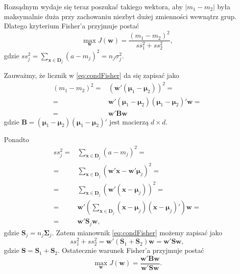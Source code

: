 \documentclass[
]{book}
\theoremstyle{plain}
\theoremstyle{definition}
\theoremstyle{definition}
\theoremstyle{definition}
\theoremstyle{definition}
\theoremstyle{definition}
\theoremstyle{remark}
\begin{document}
Rozsądnym wydaje się teraz poszukać takiego wektora, aby \(|m_1-m_2|\) była maksymalnie duża przy zachowaniu niezbyt dużej zmienności wewnątrz grup. Dlatego kryterium Fisher'a przyjmuje postać
\begin{equation}
    \max_{ \boldsymbol w}J(\boldsymbol w)=\frac{(m_1-m_2)^2}{ss_1^2+ss_2^2},
    \label{eq:condFisher}
\end{equation}
gdzie \(ss_j^2=\sum_{ \boldsymbol x\in \boldsymbol D_j}(a-m_j)^2=n_j\sigma_j^2.\)

Zauważmy, że licznik w \eqref{eq:condFisher} da się zapisać jako
\begin{align}
    (m_1-m_2)^2=& ( \boldsymbol w'( \boldsymbol \mu_1- \boldsymbol \mu_2))^2=\\
    =& \boldsymbol w'(\boldsymbol \mu_1- \boldsymbol \mu_2)(\boldsymbol \mu_1- \boldsymbol \mu_2)'\boldsymbol w=\\
    =& \boldsymbol w' \boldsymbol B \boldsymbol w
\end{align}
gdzie \(\boldsymbol B=(\boldsymbol \mu_1- \boldsymbol \mu_2)(\boldsymbol \mu_1- \boldsymbol \mu_2)'\) jest macierzą \(d\times d\).

Ponadto
\begin{align}
    ss_j^2=&\sum_{ \boldsymbol x\in \boldsymbol D_j}(a-m_j)^2=\\
    =&\sum_{ \boldsymbol x\in \boldsymbol D_j}( \boldsymbol w' \boldsymbol x- \boldsymbol w' \boldsymbol\mu_j)^2=\\
    =& \sum_{ \boldsymbol x\in \boldsymbol D_j}( \boldsymbol{w}'( \boldsymbol{x}- \boldsymbol{\mu}_j))^2=\\
    =& \boldsymbol{w}'\left(\sum_{ \boldsymbol x\in \boldsymbol D_j}(\boldsymbol{x}-\boldsymbol \mu_j)(\boldsymbol x- \boldsymbol \mu_j)'\right) \boldsymbol{w}=\\
    =& \boldsymbol{w}' \boldsymbol{S}_j \boldsymbol{w},
    \label{eq:Sj}
\end{align}
gdzie \(\boldsymbol{S}_j=n_j \boldsymbol{\Sigma}_j\).
Zatem mianownik \eqref{eq:condFisher} możemy zapisać jako
\begin{equation}
    ss_1^2+ss_2^2= \boldsymbol{w}'(\boldsymbol{S}_1+ \boldsymbol{S}_2) \boldsymbol{w}= \boldsymbol{w}' \boldsymbol{S} \boldsymbol{w},
\end{equation}
gdzie \(\boldsymbol{S}=\boldsymbol{S}_1+\boldsymbol{S}_2\).
Ostatecznie warunek Fisher'a przyjmuje postać
\begin{equation}
    \max_{ \boldsymbol{w}}J( \boldsymbol{w})=\frac{ \boldsymbol{w}' \boldsymbol{B} \boldsymbol{w}}{ \boldsymbol{w}' \boldsymbol{S} \boldsymbol{w}}.
    \label{eq:condFisher2}
\end{equation}
\end{document}
